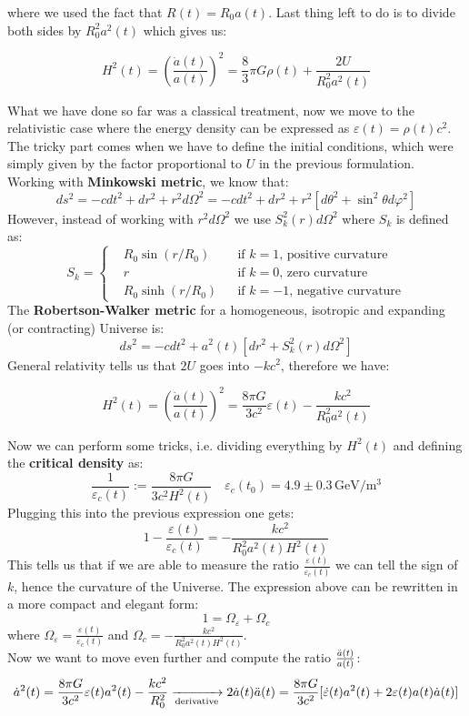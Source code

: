 \documentclass[10.75pt,a4paper,openright,bottom=2cm]{article}
\newcommand{\beginbox}[1]{\begin{tcolorbox}[width=\textwidth,colback={black!40},title={#1},colbacktitle={purple!55},coltitle=black]}
\renewcommand{\endbox}{\end{tcolorbox}\noindent}
\begin{document}
where we used the fact that $R(t)=R_0a(t)$. Last thing left to do is to divide both sides by $R_0^2a^2(t)$ which gives us:
\beginbox{Friedmann Equation (classical derivation)}
\[
H^2(t)=\left(\frac{\Dot{a}(t)}{a(t)}\right)^2=\frac{8}{3}\pi G\rho(t)+\frac{2U}{R_0^2a^2(t)}
\]
\endbox
What we have done so far was a classical treatment, now we move to the relativistic case where the energy density can be expressed as $\varepsilon(t)=\rho(t)c^2$. The tricky part comes when we have to define the initial conditions, which were simply given by the factor proportional to $U$ in the previous formulation. Working with \textbf{Minkowski metric}, we know that:
\[
ds^2=-cdt^2+dr^2+r^2d\Omega^2=-cdt^2+dr^2+r^2[d\theta^2+\sin^2\theta d\varphi^2]
\]
However, instead of working with $r^2d\Omega^2$ we use $S_k^2(r)d\Omega^2$ where $S_k$ is defined as:
\[
S_k=\left\{\begin{aligned}
&R_0\sin(r/R_0) &&\text{if $k=1$, positive curvature}\\
&r &&\text{if $k=0$, zero curvature}\\
&R_0\sinh(r/R_0) &&\text{if $k=-1$, negative curvature}
\end{aligned}\right.
\]
The \textbf{Robertson-Walker metric} for a homogeneous, isotropic and expanding (or contracting) Universe is:
\[
ds^2=-cdt^2+a^2(t)[dr^2+S_k^2(r)d\Omega^2]
\]
General relativity tells us that $2U$ goes into $-kc^2$, therefore we have:
\beginbox{Friedmann Equation (relativistic version)}
\[
H^2(t)=\left(\frac{\Dot{a}(t)}{a(t)}\right)^2=\frac{8\pi G}{3c^2}\varepsilon(t)-\frac{kc^2}{R_0^2a^2(t)}
\]
\endbox
Now we can perform some tricks, i.e. dividing everything by $H^2(t)$ and defining the \textbf{critical density} as:
\[
\frac{1}{\varepsilon_c(t)}:=\frac{8\pi G}{3c^2H^2(t)} \quad \varepsilon_c(t_0)=4.9\pm0.3\,\text{GeV/m$^3$}
\]
Plugging this into the previous expression one gets:
\[
1-\frac{\varepsilon(t)}{\varepsilon_c(t)}=-\frac{kc^2}{R_0^2a^2(t)H^2(t)}
\]
This tells us that if we are able to measure the ratio $\frac{\varepsilon(t)}{\varepsilon_c(t)}$ we can tell the sign of $k$, hence the curvature of the Universe. The expression above can be rewritten in a more compact and elegant form:
\[
1=\Omega_\varepsilon+\Omega_c
\]
where $\Omega_\varepsilon=\frac{\varepsilon(t)}{\varepsilon_c(t)}$ and $\Omega_c=-\frac{kc^2}{R_0^2a^2(t)H^2(t)}$.\\
Now we want to move even further and compute the ratio $\frac{\Ddot{a}(t)}{a(t)}$:
\[
\Dot{a}^2(t)=\frac{8\pi G}{3c^2}\varepsilon(t)a^2(t)-\frac{kc^2}{R_0^2}\xrightarrow[\text{derivative}]{}2\Dot{a}(t)\Ddot{a}(t)=\frac{8\pi G}{3c^2}[\Dot{\varepsilon}(t)a^2(t)+2\varepsilon(t)a(t)\Dot{a}(t)]
\]
\end{document}
